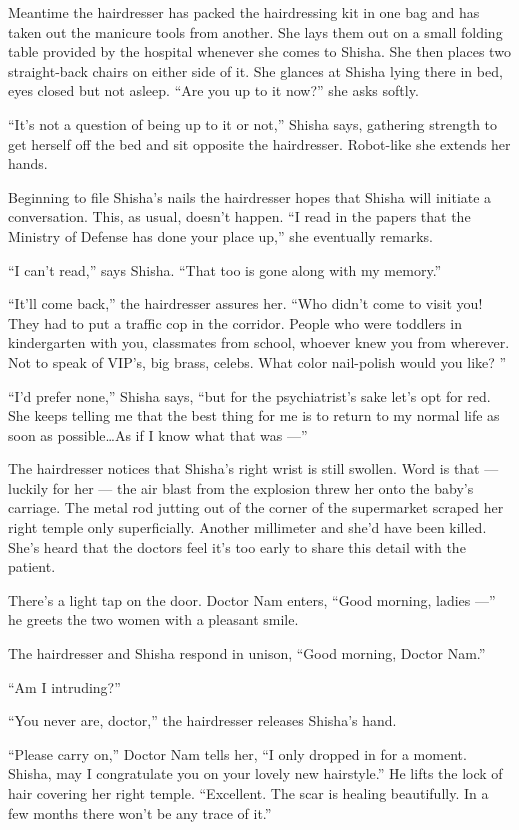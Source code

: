 \documentclass[twoside,11pt,openany]{book}
\begin{document}
Meantime the hairdresser has packed the hairdressing kit in one bag and has taken out the manicure tools from another.
She lays them out on a small folding table provided by the hospital whenever she comes to Shisha. She then places two
straight-back chairs on either side of it. She glances at Shisha lying there in bed, eyes closed but not asleep.
``Are you up to it now?'' she asks softly.

``It's not a question of being up to it or not,'' Shisha says, gathering strength to get
herself off the bed and sit opposite the hairdresser. Robot-like she extends her hands.

Beginning to file Shisha's nails the hairdresser hopes that Shisha will initiate a conversation. This, as usual,
doesn't happen. ``I read in the papers that the Ministry of Defense has done your place up,''
she eventually remarks.

``I can't read,'' says Shisha. ``That too is gone along with my
memory.''

``It'll come back,'' the hairdresser assures her. ``Who didn't come to visit you!
They had to put a traffic cop in the corridor. People who were toddlers in kindergarten with you, classmates from
school, whoever knew you from wherever. Not to speak of VIP's, big brass, celebs. What color nail-polish would you
like? ''

``I'd{ }prefer none,'' Shisha says,
``but for the psychiatrist's sake let's opt for red. She keeps telling me that the best thing for me is to
return to my normal life as soon as possible{\ldots}As if I know what that was ---''

The hairdresser notices that Shisha's right wrist is still swollen. Word is that --- luckily for her --- the air blast from
the explosion threw her onto the baby's carriage. The metal rod jutting out of the corner of the supermarket scraped
her right temple only superficially. Another millimeter and she'd have been killed. She's heard that the doctors feel
it's too early to share this detail with the patient.

There's a light tap on the door. Doctor Nam enters, ``Good morning, ladies ---'' he greets the
two women with a pleasant smile.

The hairdresser and Shisha respond in unison, ``Good morning, Doctor Nam.''

``Am I intruding?''

``You never are, doctor,'' the hairdresser releases Shisha's hand.

``Please carry on,'' Doctor Nam tells her, ``I only dropped in for a moment.
Shisha, may I congratulate you on your lovely new hairstyle.'' He lifts the lock of hair covering her
right temple. ``Excellent. The scar is healing beautifully.  In a few months there won't be any trace of
it.''
\end{document}
